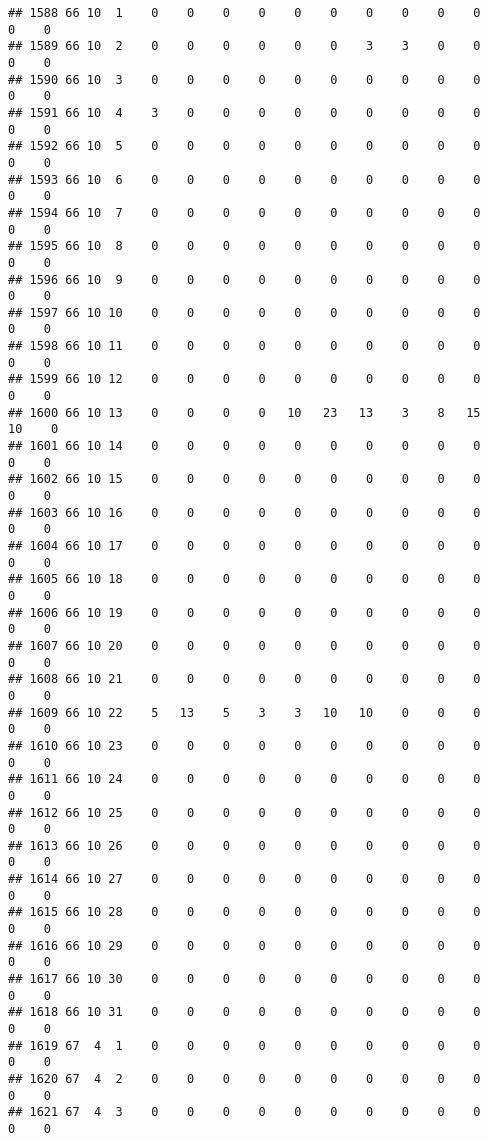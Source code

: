 \documentclass[]{article}
\begin{document}
\begin{verbatim}
## 1588 66 10  1    0    0    0    0    0    0    0    0    0    0    0    0
## 1589 66 10  2    0    0    0    0    0    0    3    3    0    0    0    0
## 1590 66 10  3    0    0    0    0    0    0    0    0    0    0    0    0
## 1591 66 10  4    3    0    0    0    0    0    0    0    0    0    0    0
## 1592 66 10  5    0    0    0    0    0    0    0    0    0    0    0    0
## 1593 66 10  6    0    0    0    0    0    0    0    0    0    0    0    0
## 1594 66 10  7    0    0    0    0    0    0    0    0    0    0    0    0
## 1595 66 10  8    0    0    0    0    0    0    0    0    0    0    0    0
## 1596 66 10  9    0    0    0    0    0    0    0    0    0    0    0    0
## 1597 66 10 10    0    0    0    0    0    0    0    0    0    0    0    0
## 1598 66 10 11    0    0    0    0    0    0    0    0    0    0    0    0
## 1599 66 10 12    0    0    0    0    0    0    0    0    0    0    0    0
## 1600 66 10 13    0    0    0    0   10   23   13    3    8   15   10    0
## 1601 66 10 14    0    0    0    0    0    0    0    0    0    0    0    0
## 1602 66 10 15    0    0    0    0    0    0    0    0    0    0    0    0
## 1603 66 10 16    0    0    0    0    0    0    0    0    0    0    0    0
## 1604 66 10 17    0    0    0    0    0    0    0    0    0    0    0    0
## 1605 66 10 18    0    0    0    0    0    0    0    0    0    0    0    0
## 1606 66 10 19    0    0    0    0    0    0    0    0    0    0    0    0
## 1607 66 10 20    0    0    0    0    0    0    0    0    0    0    0    0
## 1608 66 10 21    0    0    0    0    0    0    0    0    0    0    0    0
## 1609 66 10 22    5   13    5    3    3   10   10    0    0    0    0    0
## 1610 66 10 23    0    0    0    0    0    0    0    0    0    0    0    0
## 1611 66 10 24    0    0    0    0    0    0    0    0    0    0    0    0
## 1612 66 10 25    0    0    0    0    0    0    0    0    0    0    0    0
## 1613 66 10 26    0    0    0    0    0    0    0    0    0    0    0    0
## 1614 66 10 27    0    0    0    0    0    0    0    0    0    0    0    0
## 1615 66 10 28    0    0    0    0    0    0    0    0    0    0    0    0
## 1616 66 10 29    0    0    0    0    0    0    0    0    0    0    0    0
## 1617 66 10 30    0    0    0    0    0    0    0    0    0    0    0    0
## 1618 66 10 31    0    0    0    0    0    0    0    0    0    0    0    0
## 1619 67  4  1    0    0    0    0    0    0    0    0    0    0    0    0
## 1620 67  4  2    0    0    0    0    0    0    0    0    0    0    0    0
## 1621 67  4  3    0    0    0    0    0    0    0    0    0    0    0    0

\end{verbatim}
\end{document}
